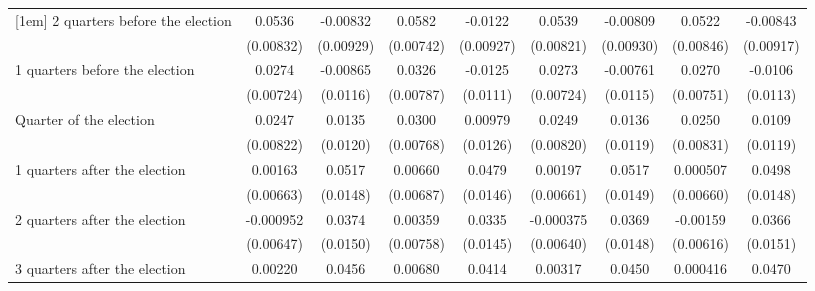 \begin{table}[htbp]
\begin{tabular}{l*{8}{c}}
[1em]
 2 quarters before the election&      0.0536\sym{***}&    -0.00832         &      0.0582\sym{***}&     -0.0122         &      0.0539\sym{***}&    -0.00809         &      0.0522\sym{***}&    -0.00843         \\
                    &   (0.00832)         &   (0.00929)         &   (0.00742)         &   (0.00927)         &   (0.00821)         &   (0.00930)         &   (0.00846)         &   (0.00917)         \\
[1em]
 1 quarters before the election&      0.0274\sym{***}&    -0.00865         &      0.0326\sym{***}&     -0.0125         &      0.0273\sym{***}&    -0.00761         &      0.0270\sym{***}&     -0.0106         \\
                    &   (0.00724)         &    (0.0116)         &   (0.00787)         &    (0.0111)         &   (0.00724)         &    (0.0115)         &   (0.00751)         &    (0.0113)         \\
[1em]
Quarter of the election&      0.0247\sym{**} &      0.0135         &      0.0300\sym{***}&     0.00979         &      0.0249\sym{**} &      0.0136         &      0.0250\sym{**} &      0.0109         \\
                    &   (0.00822)         &    (0.0120)         &   (0.00768)         &    (0.0126)         &   (0.00820)         &    (0.0119)         &   (0.00831)         &    (0.0119)         \\
[1em]
 1 quarters after the election&     0.00163         &      0.0517\sym{***}&     0.00660         &      0.0479\sym{**} &     0.00197         &      0.0517\sym{***}&    0.000507         &      0.0498\sym{***}\\
                    &   (0.00663)         &    (0.0148)         &   (0.00687)         &    (0.0146)         &   (0.00661)         &    (0.0149)         &   (0.00660)         &    (0.0148)         \\
[1em]
 2 quarters after the election&   -0.000952         &      0.0374\sym{*}  &     0.00359         &      0.0335\sym{*}  &   -0.000375         &      0.0369\sym{*}  &    -0.00159         &      0.0366\sym{*}  \\
                    &   (0.00647)         &    (0.0150)         &   (0.00758)         &    (0.0145)         &   (0.00640)         &    (0.0148)         &   (0.00616)         &    (0.0151)         \\
[1em]
 3 quarters after the election&     0.00220         &      0.0456\sym{***}&     0.00680         &      0.0414\sym{***}&     0.00317         &      0.0450\sym{***}&    0.000416         &      0.0470\sym{***}\\

\end{tabular}
\end{table}
